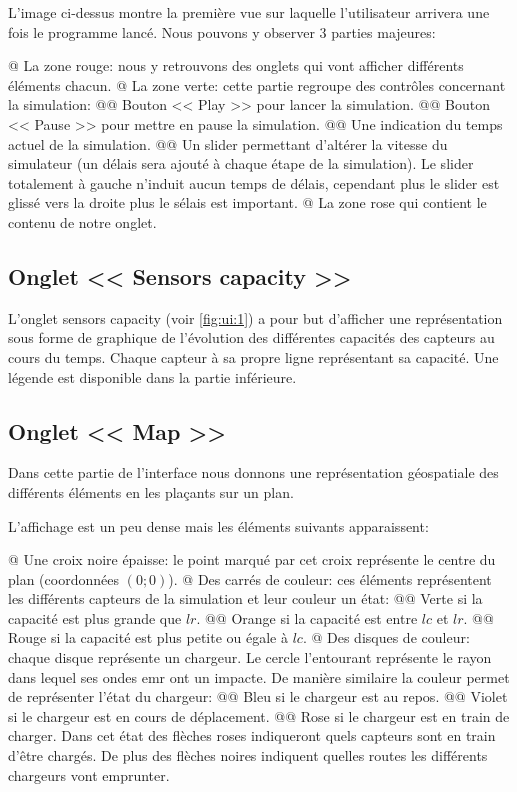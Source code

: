 \documentclass[final]{polytech/polytech}
\begin{document}
		L'image ci-dessus montre la première vue sur laquelle l'utilisateur arrivera une fois le programme lancé.
		Nous pouvons y observer 3 parties majeures:
		\begin{easylist}
			@ La zone rouge: nous y retrouvons des onglets qui vont afficher différents éléments chacun.
			@ La zone verte: cette partie regroupe des contrôles concernant la simulation:
			@@ Bouton << Play >> pour lancer la simulation.
			@@ Bouton << Pause >> pour mettre en pause la simulation.
			@@ Une indication du temps actuel de la simulation.
			@@ Un slider permettant d'altérer la vitesse du simulateur (un délais sera ajouté à chaque étape de la simulation). Le slider totalement à gauche n'induit aucun temps de délais, cependant plus le slider est glissé vers la droite plus le sélais est important.
			@ La zone rose qui contient le contenu de notre onglet.
		\end{easylist}
		
		\subsection{Onglet << Sensors capacity >>}
			L'onglet sensors capacity (voir \autoref{fig:ui:1}) a pour but d'afficher une représentation sous forme de graphique de l'évolution des différentes capacités des capteurs au cours du temps.
			Chaque capteur à sa propre ligne représentant sa capacité.
			Une légende est disponible dans la partie inférieure.
			
		\subsection{Onglet << Map >>}
			Dans cette partie de l'interface nous donnons une représentation géospatiale des différents éléments en les plaçants sur un plan.
			
			
			L'affichage est un peu dense mais les éléments suivants apparaissent:
			\begin{easylist}
				@ Une croix noire épaisse: le point marqué par cet croix représente le centre du plan (coordonnées $\left(0;0\right)$).
				@ Des carrés de couleur: ces éléments représentent les différents capteurs de la simulation et leur couleur un état:
				@@ Verte si la capacité est plus grande que $lr$.
				@@ Orange si la capacité est entre $lc$ et $lr$.
				@@ Rouge si la capacité est plus petite ou égale à $lc$.
				@ Des disques de couleur: chaque disque représente un chargeur. Le cercle l'entourant représente le rayon dans lequel ses ondes \gls{emr} ont un impacte. De manière similaire la couleur permet de représenter l'état du chargeur:
				@@ Bleu si le chargeur est au repos.
				@@ Violet si le chargeur est en cours de déplacement.
				@@ Rose si le chargeur est en train de charger. Dans cet état des flèches roses indiqueront quels capteurs sont en train d'être chargés.
				De plus des flèches noires indiquent quelles routes les différents chargeurs vont emprunter.
			\end{easylist}
\end{document}
